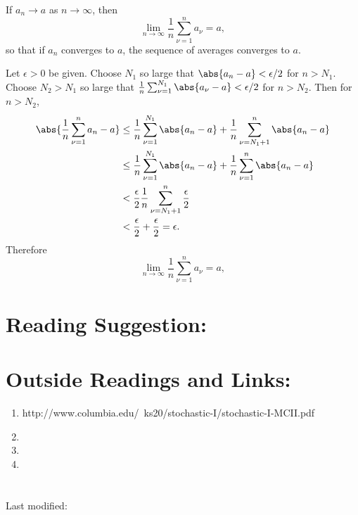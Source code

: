 \documentclass[12pt]{article}
\begin{document}
\begin{exercise}
    If \( a_n \to a \) as \( n \to \infty \), then
    \[
        \lim_{n \to \infty} \frac{1}{n} \sum\limits_{\nu=1}^{n} a_\nu =
        a,
    \] so that if \( a_n \) converges to \( a \), the sequence of
    averages converges to \( a \).
\end{exercise}
\begin{solution}
    Let \( \epsilon > 0 \) be given.  Choose \( N_1 \) so large that \(
    \abs{a_n - a} < \epsilon/2 \) for \( n > N_1 \).  Choose \( N_2 > N_1
    \) so large that \( \frac{1}{n} \sum_{\nu=1}^{N_1} \abs{a_{\nu} - a}
    < \epsilon/2 \) for \( n > N_2 \).  Then for \( n > N_2 \),
    \begin{align*}
        \abs{\frac{1}{n} \sum\limits_{\nu=1}^{n} a_n - a} &\le \frac{1}{n}
        \sum\limits_{\nu=1}^{N_1} \abs{a_n - a} + \frac{1}{n} \sum\limits_
        {\nu=N_1+1}^{n} \abs{a_n - a} \\
        &\le \frac{1}{n} \sum\limits_{\nu=1}^{N_1} \abs{a_n - a} + \frac
        {1}{n} \sum\limits_{\nu=1}^{n} \abs{a_n - a} \\
        &< \frac{\epsilon}{2} \frac{1}{n} \sum\limits_{\nu=N_1+1}^{n}
        \frac{\epsilon}{2} \\
        &< \frac{\epsilon}{2} + \frac{\epsilon}{2} = \epsilon.
    \end{align*}
    Therefore
    \[
        \lim_{n \to \infty} \frac{1}{n} \sum\limits_{\nu=1}^{n} a_{\nu}
        = a,
    \]
\end{solution}

\hr

\section*{Reading Suggestion:}




\hr

\section*{Outside Readings and Links:}
\begin{enumerate}
    \item
        http://www.columbia.edu/~ks20/stochastic-I/stochastic-I-MCII.pdf
    \item
    \item
    \item
\end{enumerate}

\section*{\solutionsname} \loadSolutions

\hr

\mydisclaim \myfooter

Last modified:  \flastmod
\end{document}
